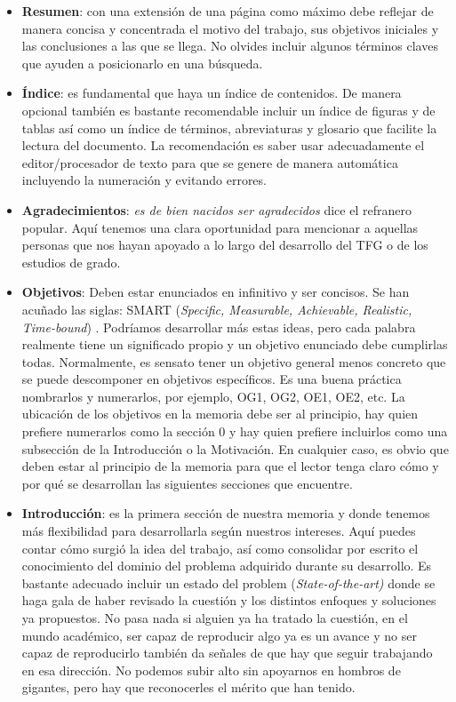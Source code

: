 \begin{itemize}
    \item \textbf{Resumen}: con una extensión de una página como máximo debe reflejar de manera concisa y concentrada el motivo del trabajo, sus objetivos iniciales y las conclusiones a las que se llega. No olvides incluir algunos términos claves que ayuden a posicionarlo en una búsqueda.
    \item \textbf{Índice}: es fundamental que haya un índice de contenidos. De manera opcional también es bastante recomendable incluir un índice de figuras y de tablas así como un índice de términos, abreviaturas y glosario que facilite la lectura del documento. La recomendación es saber usar adecuadamente el editor/procesador de texto para que se genere de manera automática incluyendo la numeración y evitando errores.
    
    \item \textbf{Agradecimientos}: {\it es de bien nacidos ser agradecidos} dice el refranero popular. Aquí tenemos una clara oportunidad para mencionar a aquellas personas que nos hayan apoyado a lo largo del desarrollo del TFG o de los estudios de grado. 
    \item \textbf{Objetivos}: Deben estar enunciados en infinitivo y ser concisos. Se han acuñado las siglas: SMART (\textit{Specific, Measurable, Achievable, Realistic, Time-bound}) \cite{doran1981there}.  Podríamos desarrollar más estas ideas, pero cada palabra realmente tiene un significado propio y un objetivo enunciado debe cumplirlas todas. Normalmente, es sensato tener un objetivo general menos concreto que se puede descomponer en objetivos específicos. Es una buena práctica nombrarlos y numerarlos, por ejemplo,  OG1, OG2, OE1, OE2, etc. La ubicación de los objetivos en la memoria debe ser al principio, hay quien prefiere numerarlos como la sección 0 y hay quien prefiere incluirlos como una subsección de la Introducción o la Motivación. En cualquier caso, es obvio que deben estar al principio de la memoria para que el lector tenga claro cómo y por qué se desarrollan las siguientes secciones que encuentre.

    \item \textbf{Introducción}: es la primera sección de nuestra memoria y donde tenemos más flexibilidad para desarrollarla según nuestros intereses. Aquí puedes contar cómo surgió la idea del trabajo, así como consolidar por escrito el conocimiento del dominio del problema adquirido durante su desarrollo. Es bastante adecuado incluir un estado del problem (\textit{State-of-the-art)} donde se haga gala de haber revisado la cuestión y los distintos enfoques y soluciones ya propuestos. No pasa nada si alguien ya ha tratado la cuestión, en el mundo académico, ser capaz de reproducir algo ya es un avance y no ser capaz de reproducirlo también da señales de que hay que seguir trabajando en esa dirección. No podemos subir alto sin apoyarnos en hombros de gigantes, pero hay que reconocerles el mérito que han tenido.


\end{itemize}
